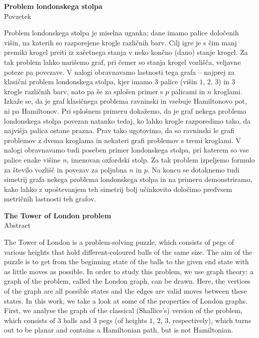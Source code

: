\documentclass[12pt,a4paper]{amsart}
\theoremstyle{definition} %
\theoremstyle{plain} %
\newcommand{\naslovdela}{Problem londonskega stolpa}
\begin{document}
\thispagestyle{empty}
\begin{center}
{\bf \naslovdela}\\[3mm]
{\sc Povzetek}
\end{center}
Problem londonskega stolpa je miselna uganka; dane imamo palice določenih višin, na katerih so razporejene krogle različnih barv. Cilj igre je s čim manj premiki krogel preiti iz začetnega stanja v neko končno (dano) stanje krogel. Za tak problem lahko narišemo graf, pri čemer so stanja krogel vozlišča, veljavne poteze pa povezave. V nalogi obravnavamo lastnosti tega grafa -- najprej za klasični problem londonskega stolpa, kjer imamo $3$ palice (višin $1$, $2$, $3$) in 3 krogle različnih barv, nato pa še za splošen primer s $p$ palicami in $n$ kroglami. Izkaže se, da je graf klasičnega problema ravninski in vsebuje Hamiltonovo pot, ni pa Hamiltonov. Pri splošnem primeru dokažemo, da je graf nekega problema londonskega stolpa povezan natanko tedaj, ko lahko krogle razporedimo tako, da najvišja palica ostane prazna. Prav tako ugotovimo, da so ravninski le grafi problemov z dvema kroglama in nekateri grafi problemov s tremi kroglami. V nalogi obravnavamo tudi poseben primer londonskega stolpa, pri katerem so vse palice enake višine $n$, imenovan oxfordski stolp. Za tak problem izpeljemo formulo za število vozlišč in povezav za poljubna $n$ in $p$. Na koncu se dotaknemo tudi simetrij grafa nekega problema londonskega stolpa in na primeru demonstriramo, kako lahko z upoštevanjem teh simetrij bolj učinkovito določimo predvsem metričnih lastnosti teh grafov.
\vfill
\begin{center}
{\bf The Tower of London problem}\\[3mm] %
{\sc Abstract}
\end{center}
The Tower of London is a problem-solving puzzle, which consists of pegs of various heights that hold different-coloured balls of the same size. The aim of the puzzle is to get from the beginning state of the balls to the given end state with as little moves as possible. In order to study this problem, we use graph theory: a graph of the problem, called the London graph, can be drawn. Here, the vertices of the graph are all possible states and the edges are valid moves between these states. In this work, we take a look at some of the properties of London graphs. First, we analyse the graph of the classical (Shallice's) version of the problem, which consists of $3$ balls and $3$ pegs (of heights $1$, $2$, $3$, respectively), which turns out to be planar and contains a Hamiltonian path, but is not Hamiltonian.
\end{document}
